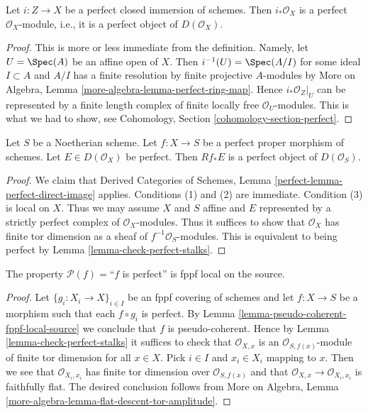 \begin{lemma}
\label{lemma-perfect-closed-immersion-perfect-direct-image}
Let $i : Z \to X$ be a perfect closed immersion of schemes.
Then $i_*\mathcal{O}_X$ is a perfect $\mathcal{O}_X$-module, i.e.,
it is a perfect object of $D(\mathcal{O}_X)$.
\end{lemma}

\begin{proof}
This is more or less immediate from the definition. Namely, let
$U = \Spec(A)$ be an affine open of $X$. Then $i^{-1}(U) = \Spec(A/I)$
for some ideal $I \subset A$ and $A/I$ has a finite resolution by
finite projective $A$-modules by
More on Algebra, Lemma \ref{more-algebra-lemma-perfect-ring-map}.
Hence $i_*\mathcal{O}_Z|_U$ can be represented by a finite
length complex of finite locally free $\mathcal{O}_U$-modules.
This is what we had to show, see
Cohomology, Section \ref{cohomology-section-perfect}.
\end{proof}

\begin{lemma}
\label{lemma-perfect-proper-perfect-direct-image}
Let $S$ be a Noetherian scheme. Let $f : X \to S$ be a perfect proper
morphism of schemes. Let $E \in D(\mathcal{O}_X)$ be perfect. Then
$Rf_*E$ is a perfect object of $D(\mathcal{O}_S)$.
\end{lemma}

\begin{proof}
We claim that Derived Categories of Schemes, Lemma
\ref{perfect-lemma-perfect-direct-image} applies.
Conditions (1) and (2) are immediate. Condition (3) is local
on $X$. Thus we may assume $X$ and $S$ affine and $E$
represented by a strictly perfect complex of $\mathcal{O}_X$-modules.
Thus it suffices to show that $\mathcal{O}_X$ has finite
tor dimension as a sheaf of $f^{-1}\mathcal{O}_S$-modules.
This is equivalent to being perfect by
Lemma \ref{lemma-check-perfect-stalks}.
\end{proof}

\begin{lemma}
\label{lemma-perfect-fppf-local-source}
The property $\mathcal{P}(f) =$``$f$ is perfect''
is fppf local on the source.
\end{lemma}

\begin{proof}
Let $\{g_i : X_i \to X\}_{i \in I}$ be an fppf covering of schemes and let
$f : X \to S$ be a morphism such that each $f \circ g_i$ is
perfect. By
Lemma \ref{lemma-pseudo-coherent-fppf-local-source}
we conclude that $f$ is pseudo-coherent.
Hence by
Lemma \ref{lemma-check-perfect-stalks}
it suffices to check that $\mathcal{O}_{X, x}$ is an
$\mathcal{O}_{S, f(x)}$-module of finite tor dimension for all $x \in X$.
Pick $i \in I$ and $x_i \in X_i$ mapping to $x$. Then we see that
$\mathcal{O}_{X_i, x_i}$ has finite tor dimension over
$\mathcal{O}_{S, f(x)}$ and that
$\mathcal{O}_{X, x} \to \mathcal{O}_{X_i, x_i}$ is faithfully flat.
The desired conclusion follows from
More on Algebra, Lemma \ref{more-algebra-lemma-flat-descent-tor-amplitude}.
\end{proof}

